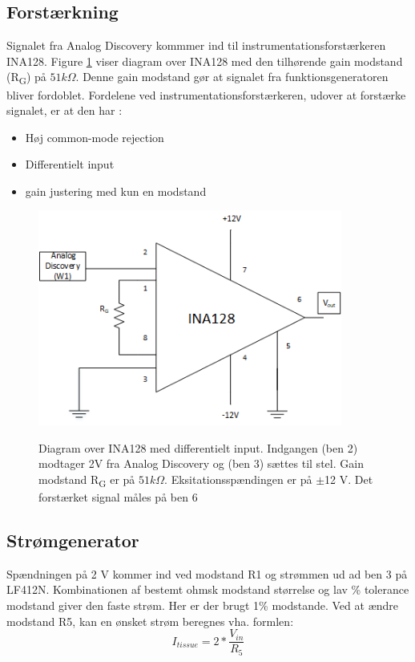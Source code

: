 \subsection{Forstærkning}
Signalet fra Analog Discovery kommmer ind til instrumentationsforstærkeren INA128. Figure \ref{fig:ina128} viser diagram over INA128 med den tilhørende gain modstand (R\textsubscript{G}) på $ 51k\Omega $. Denne gain modstand gør at signalet fra funktionsgeneratoren bliver fordoblet\citep{TexasInstruments2005}. Fordelene ved instrumentationsforstærkeren, udover at forstærke signalet, er at den har \cite{PeterJohansen2014}:
 
\begin{itemize}
\item Høj common-mode rejection
\item Differentielt input
\item gain justering med kun en modstand
\end{itemize}


\begin{figure}[H]
\centering
{\includegraphics[width=10cm]
{Figure/ina128}}
\caption{Diagram over INA128 med differentielt input. Indgangen (ben 2) modtager 2V fra Analog Discovery og (ben 3) sættes til stel. Gain modstand R\textsubscript{G} er på $ 51k\Omega$. Eksitationsspændingen er på $\pm$12 V. Det forstærket signal måles på ben 6  }
\label{fig:ina128}
\end{figure}



\subsection{Strømgenerator}

Spændningen på 2 V kommer ind ved modstand R1 og strømmen ud ad ben 3 på LF412N. Kombinationen af bestemt ohmsk modstand størrelse og lav \% tolerance modstand giver den faste strøm. Her er der brugt 1\% modstande. Ved at ændre modstand R5, kan en ønsket strøm beregnes vha. formlen\cite{Aroom2009}: $$I_{tissue}=2*\frac{V_{in}}{R_{5}}$$


